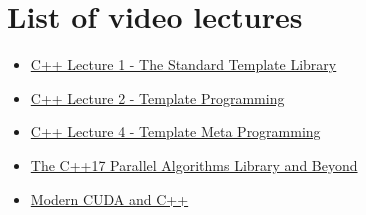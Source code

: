 \documentclass[11pt,fleqn]{book} %
\begin{document}
\cleardoublepage %
{}
\lstlistoflistings


\cleardoublepage %
{}
\listoffigures


\chapter*{List of video lectures}


\begin{itemize}
\item \href{https://www.youtube.com/watch?v=asGZTCR53KY&list=PL7vEgTL3FalY2eBxud1wsfz8OKvE9sd_z}{C++ Lecture 1 - The Standard Template Library}
\item \href{https://www.youtube.com/watch?v=iU3wsiJ5mts}{C++ Lecture 2 - Template Programming }
\item \href{https://www.youtube.com/watch?v=6PWUByLZO0g}{C++ Lecture 4 - Template Meta Programming}
\item \href{https://www.youtube.com/watch?v=Vck6kzWjY88}{The C++17 Parallel Algorithms Library and
Beyond}
\item \href{https://youtu.be/5vr7ItjyIH8}{Modern CUDA and C++}
\end{itemize}
\end{document}
